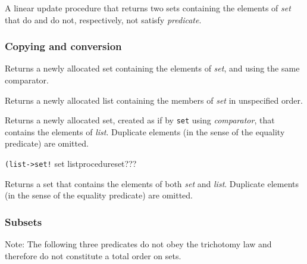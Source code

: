 \begin{entry}{%
  }

  A linear update procedure that returns two sets containing the
  elements of \emph{set} that do and do not, respectively, not satisfy
  \emph{predicate}.
\end{entry}

\subsubsection{Copying and conversion}

\begin{entry}{%
  }

  Returns a newly allocated set containing the elements of \emph{set},
  and using the same comparator.
\end{entry}

\begin{entry}{
  }

  Returns a newly allocated list containing the members of \emph{set}
  in unspecified order.
\end{entry}

\begin{entry}{%
  }

  Returns a newly allocated set, created as if by \texttt{set} using
  \emph{comparator}, that contains the elements of
  \emph{list}. Duplicate elements (in the sense of the equality
  predicate) are omitted.
\end{entry}

\begin{entry}{%
  \texttt{(list->set!}{ set list}{procedure}{set???}}

  Returns a set that contains the elements of both \emph{set} and
  \emph{list}. Duplicate elements (in the sense of the equality
  predicate) are omitted.
\end{entry}

\subsubsection{Subsets}

Note: The following three predicates do not obey the trichotomy law and
therefore do not constitute a total order on sets.


